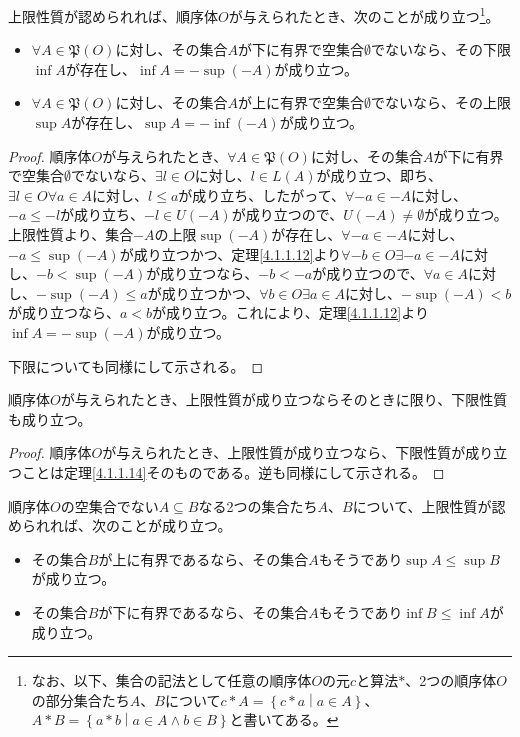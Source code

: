 \documentclass[dvipdfmx]{jsarticle}
\begin{document}
\begin{thm}\label{4.1.1.14}
上限性質が認められれば、順序体$O$が与えられたとき、次のことが成り立つ\footnote{なお、以下、集合の記法として任意の順序体$O$の元$c$と算法$*$、2つの順序体$O$の部分集合たち$A$、$B$について$c*A = \left\{ c*a \middle| a \in A \right\}$、$A*B = \left\{ a*b \middle| a \in A \land b \in B \right\}$と書いてある。}。
\begin{itemize}
\item
  $\forall A \in \mathfrak{P}(O)$に対し、その集合$A$が下に有界で空集合$\emptyset$でないなら、その下限$\inf A$が存在し、$\inf A = - \sup( - A)$が成り立つ。
\item
  $\forall A \in \mathfrak{P}(O)$に対し、その集合$A$が上に有界で空集合$\emptyset$でないなら、その上限$\sup A$が存在し、$\sup A = - \inf( - A)$が成り立つ。
\end{itemize}
\end{thm}
\begin{proof}
順序体$O$が与えられたとき、$\forall A \in \mathfrak{P}(O)$に対し、その集合$A$が下に有界で空集合$\emptyset$でないなら、$\exists l \in O$に対し、$l \in L(A)$が成り立つ、即ち、$\exists l \in O\forall a \in A$に対し、$l \leq a$が成り立ち、したがって、$\forall - a \in - A$に対し、$- a \leq - l$が成り立ち、$- l \in U( - A)$が成り立つので、$U( - A) \neq \emptyset$が成り立つ。上限性質より、集合$- A$の上限$\sup( - A)$が存在し、$\forall - a \in - A$に対し、$- a \leq \sup( - A)$が成り立つかつ、定理\ref{4.1.1.12}より$\forall - b \in O\exists - a \in - A$に対し、$- b < \sup( - A)$が成り立つなら、$- b < - a$が成り立つので、$\forall a \in A$に対し、$- \sup( - A) \leq a$が成り立つかつ、$\forall b \in O\exists a \in A$に対し、$- \sup( - A) < b$が成り立つなら、$a < b$が成り立つ。これにより、定理\ref{4.1.1.12}より$\inf A = - \sup( - A)$が成り立つ。\par
下限についても同様にして示される。
\end{proof}
\begin{thm}\label{4.1.1.15}
順序体$O$が与えられたとき、上限性質が成り立つならそのときに限り、下限性質も成り立つ。
\end{thm}
\begin{proof}
順序体$O$が与えられたとき、上限性質が成り立つなら、下限性質が成り立つことは定理\ref{4.1.1.14}そのものである。逆も同様にして示される。
\end{proof}
\begin{thm}\label{4.1.1.16}
順序体$O$の空集合でない$A \subseteq B$なる2つの集合たち$A$、$B$について、上限性質が認められれば、次のことが成り立つ。
\begin{itemize}
\item
  その集合$B$が上に有界であるなら、その集合$A$もそうであり$\sup A \leq \sup B$が成り立つ。
\item
  その集合$B$が下に有界であるなら、その集合$A$もそうであり$\inf B \leq \inf A$が成り立つ。
\end{itemize}
\end{thm}
\end{document}
